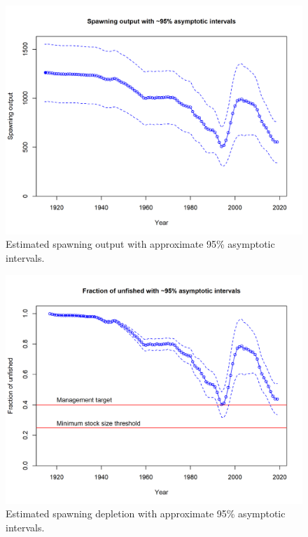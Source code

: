 \documentclass[12pt,]{article}
\begin{document}
\FloatBarrier

\begin{figure}
\centering
\includegraphics{r4ss/plots_mod1/ts7_Spawning_output_with_95_asymptotic_intervals_intervals.png}
\caption{Estimated spawning output with approximate 95\% asymptotic
intervals.
\label{fig:ts7_Spawning_biomass_(mt)_with_95_asymptotic_intervals_intervals}}
\end{figure}

\begin{figure}
\centering
\includegraphics{r4ss/plots_mod1/ts9_Fraction_of_unfished_with_95_asymptotic_intervals_intervals.png}
\caption{Estimated spawning depletion with approximate 95\% asymptotic
intervals.
\label{fig:ts9_unfished_with_95_asymptotic_intervals_intervals}}
\end{figure}
\end{document}
